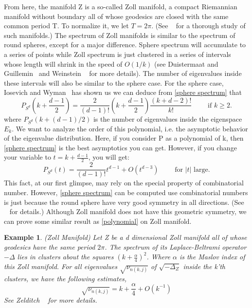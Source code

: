 \documentclass[10pt]{amsart}
\newtheorem{exmp}[theorem]{Example}
\newcommand{\1}{\mathbb{1}}
\begin{document}
From here, the manifold Z is a so-called Zoll manifold, a compact Riemannian manifold without boundary all of whose geodesics are closed with the same common period T. To normalize it, we let $T=2\pi$. (See ~\cite{Zollmanifold} for a thorough study of such manifolds.) The spectrum of Zoll manifolds is similar to the spectrum of round spheres, except for a major difference. Sphere spectrum will accumulate to a series of points while Zoll spectrum is just clustered in a series of intervals whose length will shrink in the speed of $O(1/k)$ (see Duistermaat and Guillemin~\cite{DuistermaatGuillemin} and Weinstein ~\cite{Wein77} for more details). The number of eigenvalues inside these intervals will also be similar to the sphere case. For the sphere case, Iosevich and Wyman~\cite{IoWy} has shown us we can deduce from \eqref{sphere spectrum} that 
\begin{equation*}
    P_{S^d}\left(k + \frac{d-1}{2}\right) = \frac{2}{(d-1)!}\left(k + \frac{d-1}{2}\right)\frac{(k+d-2)!}{k!} \qquad \text{ if $k \geq 2$.}
\end{equation*}
where $ P_{S^d}(k + (d-1)/2)$ is the number of eigenvalues inside the eigenspace $E_k$. We want to analyze the order of this polynomial, i.e. the asymptotic behavior of the eigenvalue distribution. Here, if you consider P as a polynomial of k, then \eqref{sphere spectrum} is the best asymptotics you can get. However, if you change your variable to $t=k+\frac{d-1}{2}$, you will get:
\begin{equation} \label{polynomial}
    P_{S^d}(t) = \frac{2}{(d-1)!} t^{d-1} + O(t^{d-3}) \qquad \text{ for $|t|$ large.}
\end{equation}
This fact, at our first glimpse, may rely on the special property of combinatorial number. However, \eqref{sphere spectrum} can be computed use combinatorial numbers is just because the round sphere have very good symmetry in all directions. (See ~\cite{SoggeHangzhou} for details.) Although Zoll manifold does not have this geometric symmetry, we can prove some similar result as \eqref{polynomial} on Zoll manifold. 

\begin{exmp}\label{Zoll Manifold}(Zoll Manifold)
Let Z be a d dimensional Zoll manifold all of whose geodesics have the same period $2\pi$. The spectrum of its Laplace-Beltrami operator $-\Delta$ lies in clusters about the squares $(k + \frac{\alpha}{4})^2$. Where $\alpha$ is the Maslov index of this Zoll manifold. For all eigenvalues $\sqrt{\nu_{n(k,j)}}$ of $\sqrt{-\Delta_Z}$ inside the k'th clusters, we have the following estimates,
\begin{equation}\label{Zollcluster}
     \sqrt{\nu_{n(k,j)}} =  k + \frac{\alpha}{4 } + O(k^{-1})
\end{equation}
See Zelditch ~\cite{FSZS} for more details.
\end{exmp}
\end{document}
